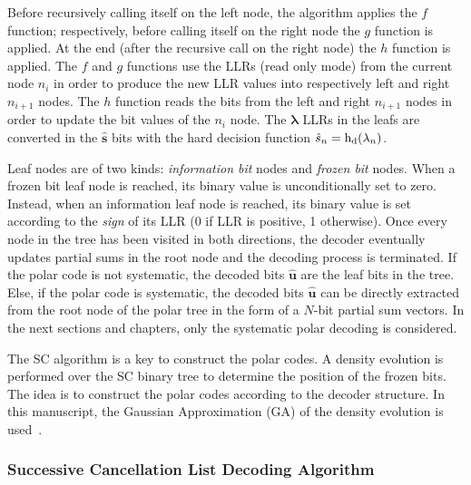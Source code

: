 Before recursively calling itself on the left node, the algorithm applies the
$f$ function; respectively, before calling itself on the right node the $g$
function is applied. At the end (after the recursive call on the right node) the
$h$ function is applied. The $f$ and $g$ functions use the LLRs (read only mode)
from the current node $n_i$ in order to produce the new LLR values into
respectively left and right $n_{i+1}$ nodes. The $h$ function reads the bits
from the left and right $n_{i+1}$ nodes in order to update the bit values of the
$n_i$ node. The $\bm{\lambda}$ LLRs in the leafs are converted in the
$\bm{\hat{s}}$ bits with the hard decision function $\hat{s}_n =
\operatorname{h_d}(\lambda_n)$.

Leaf nodes are of two kinds: \emph{information bit} nodes and \emph{frozen bit}
nodes. When a frozen bit leaf node is reached, its binary value is
unconditionally set to zero. Instead, when an information leaf node is reached,
its binary value is set according to the \emph{sign} of its LLR (0 if LLR is
positive, 1 otherwise). Once every node in the tree has been visited in both
directions, the decoder eventually updates partial sums in the root node and the
decoding process is terminated. If the polar code is not systematic, the decoded
bits $\bm{\hat{u}}$ are the leaf bits in the tree. Else, if the polar code is
systematic, the decoded bits $\bm{\hat{u}}$ can be directly extracted from the
root node of the polar tree in the form of a $N$-bit partial sum vectors. In the
next sections and chapters, only the systematic polar decoding is considered.

The SC algorithm is a key to construct the polar codes. A density evolution
is performed over the SC binary tree to determine the position of the frozen
bits. The idea is to construct the polar codes according to the decoder
structure. In this manuscript, the Gaussian Approximation (GA) of the density
evolution is used~\cite{Trifonov2012}.

\subsubsection{Successive Cancellation List Decoding Algorithm}

